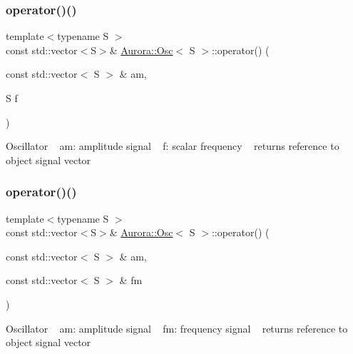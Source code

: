 \subsubsection{\texorpdfstring{operator()()}{operator()()}\hspace{0.1cm}{\footnotesize\ttfamily [3/4]}}
{\footnotesize\ttfamily template$<$typename S $>$ \\
const std\+::vector$<$S$>$\& \hyperlink{class_aurora_1_1_osc}{Aurora\+::\+Osc}$<$ S $>$\+::operator() (\begin{DoxyParamCaption}\item[{const std\+::vector$<$ S $>$ \&}]{am,  }\item[{S}]{f }\end{DoxyParamCaption})\hspace{0.3cm}{\ttfamily [inline]}}

Oscillator ~\newline
am\+: amplitude signal ~\newline
f\+: scalar frequency ~\newline
returns reference to object signal vector \mbox{\label{class_aurora_1_1_osc_a06f9ead5fbf828f7ebb8617ac6cb24b4}} 
\subsubsection{\texorpdfstring{operator()()}{operator()()}\hspace{0.1cm}{\footnotesize\ttfamily [4/4]}}
{\footnotesize\ttfamily template$<$typename S $>$ \\
const std\+::vector$<$S$>$\& \hyperlink{class_aurora_1_1_osc}{Aurora\+::\+Osc}$<$ S $>$\+::operator() (\begin{DoxyParamCaption}\item[{const std\+::vector$<$ S $>$ \&}]{am,  }\item[{const std\+::vector$<$ S $>$ \&}]{fm }\end{DoxyParamCaption})\hspace{0.3cm}{\ttfamily [inline]}}

Oscillator ~\newline
am\+: amplitude signal ~\newline
fm\+: frequency signal ~\newline
returns reference to object signal vector 

